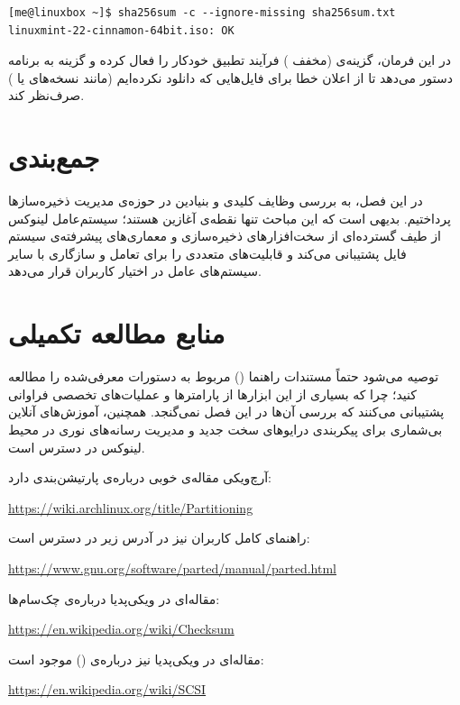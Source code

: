 \begin{latin}
\begin{lstlisting}
[me@linuxbox ~]$ sha256sum -c --ignore-missing sha256sum.txt
linuxmint-22-cinnamon-64bit.iso: OK
\end{lstlisting}
\end{latin}

در این فرمان، گزینه‌ی  (مخفف ) فرآیند تطبیق خودکار را فعال کرده و گزینه  به برنامه دستور می‌دهد تا از اعلان خطا برای فایل‌هایی که دانلود نکرده‌ایم (مانند نسخه‌های  یا ) صرف‌نظر کند.

\section{جمع‌بندی}

در این فصل، به بررسی وظایف کلیدی و بنیادین در حوزه‌ی مدیریت ذخیره‌سازها پرداختیم. بدیهی است که این مباحث تنها نقطه‌ی آغازین هستند؛ سیستم‌عامل لینوکس از طیف گسترده‌ای از سخت‌افزارهای ذخیره‌سازی و معماری‌های پیشرفته‌ی سیستم فایل پشتیبانی می‌کند و قابلیت‌های متعددی را برای تعامل و سازگاری با سایر سیستم‌های عامل در اختیار کاربران قرار می‌دهد.

\section{منابع مطالعه تکمیلی}

توصیه می‌شود حتماً مستندات راهنما () مربوط به دستورات معرفی‌شده را مطالعه کنید؛ چرا که بسیاری از این ابزارها از پارامترها و عملیات‌های تخصصی فراوانی پشتیبانی می‌کنند که بررسی آن‌ها در این فصل نمی‌گنجد. همچنین، آموزش‌های آنلاین بی‌شماری برای پیکربندی درایوهای سخت جدید و مدیریت رسانه‌های نوری در محیط لینوکس در دسترس است.

آرچ‌ویکی مقاله‌ی خوبی درباره‌ی پارتیشن‌بندی دارد:

\begin{latin}
\url{https://wiki.archlinux.org/title/Partitioning}
\end{latin}

راهنمای کامل کاربران  نیز در آدرس زیر در دسترس است:

\begin{latin}
\url{https://www.gnu.org/software/parted/manual/parted.html}
\end{latin}

مقاله‌ای در ویکی‌پدیا درباره‌ی چک‌سام‌ها:

\begin{latin}
\url{https://en.wikipedia.org/wiki/Checksum}
\end{latin}

مقاله‌ای در ویکی‌پدیا نیز درباره‌ی  () موجود است:

\begin{latin}
\url{https://en.wikipedia.org/wiki/SCSI}
\end{latin}